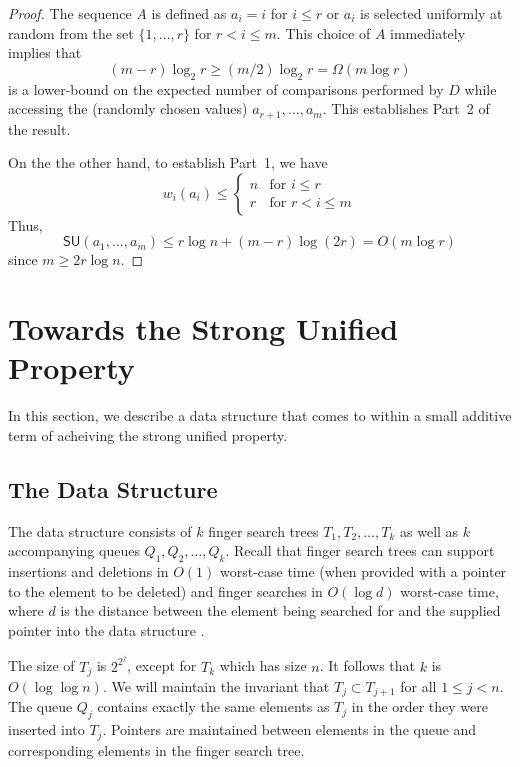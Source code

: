 \documentclass{llncs}
\newcommand{\BigOh}[1]{O\!\left(#1\right)}
\newcommand{\su}[1]{\textsf{SU}\!\left(#1\right)}
\begin{document}
\begin{proof}
  The sequence $A$ is defined as $a_i=i$ for $i\le r$ or $a_i$ is selected
  uniformly at random from the set $\{1,\ldots,r\}$ for $r< i\le m$.  This
  choice of $A$ immediately implies that 
  \[
     (m-r)\log_2 r\ge (m/2)\log_2 r = \Omega(m\log r)
  \]
  is a lower-bound on the expected number of comparisons performed by $D$
  while accessing the (randomly chosen values) $a_{r+1},\ldots,a_m$.
  This establishes Part~2 of the result.

  On the the other hand, to establish Part~1, we have
  \[
      w_i(a_i) 
        \le \begin{cases}
          n & \text{for $i\le r$} \\
          r & \text{for $r< i\le m$}
        \end{cases}
  \]
  Thus,
  \[
     \su{a_1,\ldots,a_m} \le r\log n + (m-r)\log(2r) = O(m\log r)
  \]
  since $m\ge 2r\log n$.
\end{proof}



\section{Towards the Strong Unified Property}
\label{section:main}

In this section, we describe a data structure that comes to within a small additive term of acheiving the strong unified property.

\subsection{The Data Structure}
\label{section:main:datastructure}

The data structure consists of $k$ finger search trees $T_1,T_2,\ldots,T_k$ as well as $k$ accompanying queues $Q_1,Q_2,\ldots,Q_k$. Recall that finger search trees can support insertions and deletions in $\BigOh{1}$ worst-case time (when provided with a pointer to the element to be deleted) and finger searches in $\BigOh{\log d}$ worst-case time, where $d$ is the distance between the element being searched for and the supplied pointer into the data structure \cite{DBLP:journals/jcss/BrodalLMTT03}. %

The size of $T_j$ is $2^{2^j}$, except for $T_k$ which has size $n$. It follows that $k$ is $\BigOh{\log \log n}$. We will maintain the invariant that $T_j \subset T_{j+1}$ for all $1 \le j < n$. The queue $Q_j$ contains exactly the same elements as $T_j$ in the order they were inserted into $T_j$. Pointers are maintained between elements in the queue and corresponding elements in the finger search tree.
\end{document}
